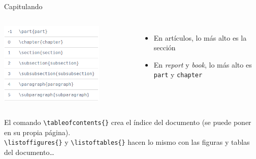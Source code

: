 \begin{frame}{Capitulando}

    \begin{columns}
            \hspace{0.75cm}\includegraphics[width=0.75\textwidth]{images/sections.png}

            \begin{itemize}
                \item En artículos, lo más alto es la sección
                \item En \textit{report} y \textit{book}, lo más alto es \texttt{part} y \texttt{chapter} 
            \end{itemize}
    \end{columns}
    
    \vspace{0.5cm}
    \pause
    
    \begin{block}{}
    El comando \texttt{\textbackslash tableofcontents\{\}} crea el índice del documento (se puede poner en su propia página).\\
    \texttt{\textbackslash listoffigures\{\}} y \texttt{\textbackslash listoftables\{\}} hacen lo mismo con las figuras y tablas del documento\ldots{}
    \end{block}
    
\end{frame}